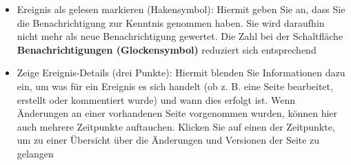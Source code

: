 \documentclass[
  letterpaper,
  DIV=11,
  numbers=noendperiod]{scrreprt}
\providecommand{\tightlist}{%
  \setlength{\itemsep}{0pt}\setlength{\parskip}{0pt}}\usepackage{longtable,booktabs,array}
\begin{document}
\begin{itemize}
\tightlist
\item
  Ereignis als gelesen markieren (Hakensymbol): Hiermit geben Sie an,
  dass Sie die Benachrichtigung zur Kenntnis genommen haben. Sie wird
  daraufhin nicht mehr als neue Benachrichtigung gewertet. Die Zahl bei
  der Schaltfläche \textbf{Benachrichtigungen (Glockensymbol)} reduziert
  sich entsprechend
\item
  Zeige Ereignis-Details (drei Punkte): Hiermit blenden Sie
  Informationen dazu ein, um was für ein Ereignis es sich handelt (ob z.
  B. eine Seite bearbeitet, erstellt oder kommentiert wurde) und wann
  dies erfolgt ist. Wenn Änderungen an einer vorhandenen Seite
  vorgenommen wurden, können hier auch mehrere Zeitpunkte auftauchen.
  Klicken Sie auf einen der Zeitpunkte, um zu einer Übersicht über die
  Änderungen und Versionen der Seite zu gelangen
\end{itemize}
\end{document}
